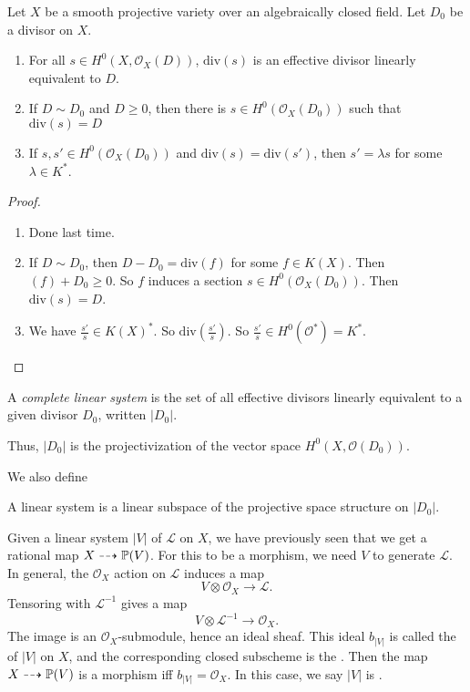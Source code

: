 \documentclass[a4paper]{article}
\renewcommand\div{\mathrm{div}}
\begin{document}
\begin{prop}
  Let $X$ be a smooth projective variety over an algebraically closed field. Let $D_0$ be a divisor on $X$.
  \begin{enumerate}
    \item For all $s \in H^0(X, \mathcal{O}_X(D))$, $\div(s)$ is an effective divisor linearly equivalent to $D$.
    \item If $D \sim D_0$ and $D \geq 0$, then there is $s \in H^0(\mathcal{O}_X(D_0))$ such that $\div(s) = D$
    \item If $s, s' \in H^0(\mathcal{O}_X(D_0))$ and $\div(s) = \div(s')$, then $s' = \lambda s$ for some $\lambda \in K^*$.
  \end{enumerate}
\end{prop}
\begin{proof}\leavevmode
  \begin{enumerate}
    \item Done last time.
    \item If $D \sim D_0$, then $D - D_0 = \div(f)$ for some $f \in K(X)$. Then $(f) + D_0 \geq 0$. So $f$ induces a section $s \in H^0(\mathcal{O}_X(D_0))$. Then $\div(s) = D$.
    \item We have $\frac{s'}{s} \in K(X)^*$. So $\div\left(\frac{s'}{s}\right)$. So $\frac{s'}{s} \in H^0(\mathcal{O}^*) = K^*$.\qedhere
  \end{enumerate}
\end{proof}

\begin{defi}
  A \emph{complete linear system} is the set of all effective divisors linearly equivalent to a given divisor $D_0$, written $|D_0|$.
\end{defi}
Thus, $|D_0|$ is the projectivization of the vector space $H^0(X, \mathcal{O}(D_0))$.

We also define
\begin{defi}
  A linear system is a linear subspace of the projective space structure on $|D_0|$.
\end{defi}

Given a linear system $|V|$ of $\mathcal{L}$ on $X$, we have previously seen that we get a rational map $X \dashrightarrow \P(V)$. For this to be a morphism, we need $V$ to generate $\mathcal{L}$. In general, the $\mathcal{O}_X$ action on $\mathcal{L}$ induces a map
\[
  V \otimes \mathcal{O}_X \to \mathcal{L}.
\]
Tensoring with $\mathcal{L}^{-1}$ gives a map
\[
  V \otimes \mathcal{L}^{-1} \to \mathcal{O}_X.
\]
The image is an $\mathcal{O}_X$-submodule, hence an ideal sheaf. This ideal $b_{|V|}$ is called the  of $|V|$ on $X$, and the corresponding closed subscheme is the . Then the map $X \dashrightarrow \P(V)$ is a morphism iff $b_{|V|} = \mathcal{O}_X$. In this case, we say $|V|$ is .
\end{document}
